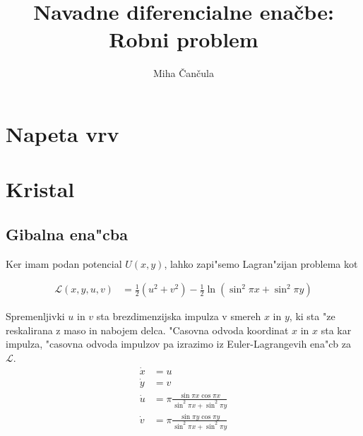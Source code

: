 \documentclass[a4paper,10pt]{article}
\title{Navadne diferencialne ena\v cbe: \\ Robni problem}
\author{Miha \v Can\v cula}
\newcommand{\lag}{\mathcal{L}}
\begin{document}
\maketitle

\section{Napeta vrv}

\section{Kristal}

\subsection{Gibalna ena"cba}

Ker imam podan potencial $U(x,y)$, lahko zapi"semo Lagran"zijan problema kot

\begin{align}
 \lag(x,y,u,v) &= \frac{1}{2} \left( u^2 + v^2 \right) - \frac{1}{2}\ln \left( \sin^2 \pi x + \sin^2 \pi y\right)
\end{align}

Spremenljivki $u$ in $v$ sta brezdimenzijska impulza v smereh $x$ in $y$, ki sta "ze reskalirana z maso in nabojem delca. "Casovna odvoda koordinat $x$ in $x$ sta kar impulza, "casovna odvoda impulzov pa izrazimo iz Euler-Lagrangevih ena"cb za $\lag$. 
\begin{align}
 \dot{x} &= u \\
 \dot{y} &= v \\
 \dot{u} &= \pi \frac{\sin \pi x \cos \pi x}{\sin^2 \pi x + \sin^2 \pi y} \\
 \dot{v} &= \pi \frac{\sin \pi y \cos \pi y}{\sin^2 \pi x + \sin^2 \pi y} 
\end{align}


 
\end{document}

